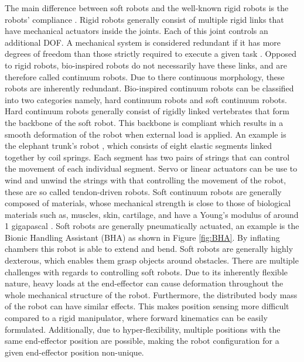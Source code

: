 The main difference between soft robots and the well-known rigid robots is the robots' compliance \cite{trivedi2008soft}. Rigid robots generally consist of multiple rigid links that have mechanical actuators inside the joints. Each of this joint controls an additional DOF. A mechanical system is considered redundant if it has more degrees of freedom than those strictly required to execute a given task \cite{chiaverini2016redundant}. Opposed to rigid robots, bio-inspired robots do not necessarily have these links, and are therefore called continuum robots. Due to there continuous morphology, these robots are inherently redundant. Bio-inspired continuum robots can be classified into two categories namely, hard continuum robots and soft continuum robots. Hard continuum robots
generally consist of rigidly linked vertebrates that form the backbone of the soft robot. This backbone is compliant which results in a smooth deformation of the robot when external load is applied. An example is the elephant trunk's robot \cite{cieslak1999elephant}, which consists of eight elastic segments linked together by coil springs. Each segment has two pairs of strings that can control the movement of each individual segment. Servo or linear actuators can be use to wind and unwind the strings with that controlling the movement of the robot, these are so called tendon-driven robots. Soft continuum robots are generally composed of materials, whose mechanical strength is close to those of biological materials such as, muscles, skin, cartilage, and have a Young's modulus of around 1 gigapascal \cite{rus2015design}. Soft robots are generally pneumatically actuated, an example is the Bionic Handling Assistant (BHA) \cite{rolf2012constant} as shown in Figure \ref{fig:BHA}. By inflating chambers this robot is able to extend and bend. Soft robots are generally highly dexterous, which enables them grasp objects around obstacles. There are multiple challenges with regards to controlling soft robots. Due to its inherently flexible nature, heavy loads at the end-effector can cause deformation throughout the whole mechanical structure of the robot. Furthermore, the distributed body mass of the robot can have similar effects. This makes position sensing more difficult compared to a rigid manipulator, where forward kinematics can be easily formulated. Additionally, due to hyper-flexibility, multiple positions with the same end-effector position are possible, making the robot configuration for a given end-effector position non-unique.

